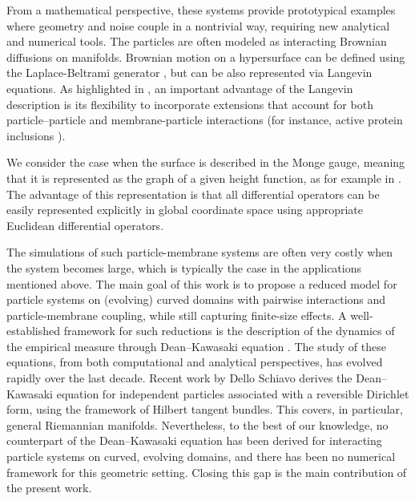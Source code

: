 \documentclass[11pt, a4paper]{article}
\begin{document}

From a mathematical perspective, these systems provide prototypical examples where geometry and noise couple in a nontrivial way, requiring new analytical and numerical tools.
The particles are often modeled as interacting Brownian diffusions on manifolds. Brownian motion on a hypersurface can be defined using the Laplace-Beltrami generator \cite{Hsu}, but can be also represented via Langevin equations. As highlighted in \cite{naji2007diffusion}, an important advantage of the Langevin description is its flexibility to incorporate extensions that account for both particle–particle and membrane-particle interactions (for instance, active protein inclusions \cite{lin2006nonequilibrium}).


We consider the case when the surface is described in the Monge gauge,  meaning that it is represented as the graph of a given height function, as for example in \cite{DuncanElliottPavliotisStuart}. The advantage of this representation is that all differential operators can be easily represented explicitly in global coordinate space using appropriate Euclidean differential operators.

The simulations of such  particle-membrane systems are often very costly when the system becomes large, which is typically the case in the applications mentioned above. The main goal of this work is to propose a reduced model for particle systems on (evolving) curved domains with pairwise interactions and particle-membrane coupling, while still capturing finite-size effects.
A well-established framework for such reductions is the description of the dynamics of the empirical measure through  Dean–Kawasaki equation \cite{dean1996langevin,kawasaki1994stochastic}. The study of these equations, from both computational \cite{donev2010accuracy,helfmann2021interacting} and analytical \cite{cornalba2023dean, Cornalba2023Density, djurdjevac2024weak,djurdjevac2025weak, Fehrman2023, fehrman2024well,konarovskyi2020dean,Konarovskyi} perspectives, has evolved rapidly over the last decade. Recent work by Dello Schiavo \cite{DelloSchiavo2024massive} derives the Dean–Kawasaki equation for independent particles associated with a reversible Dirichlet form, using the framework of Hilbert tangent bundles. This covers, in particular, general Riemannian manifolds.  Nevertheless, to the best of our knowledge, no counterpart of the Dean–Kawasaki equation has been derived for interacting particle systems on curved, evolving domains, and there has been no numerical framework for this geometric setting. Closing this gap  is the main contribution of the present work.
\end{document}
